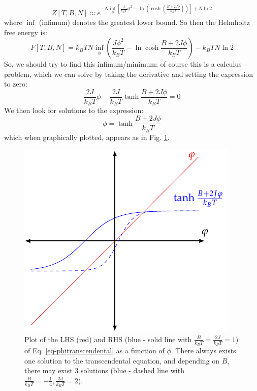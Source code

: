 \begin{equation}
    Z[T, B, N] \approx e^{-N\inf_\phi\left[\frac{J}{k_B T}\phi^2 - \ln(\cosh(\frac{B + 2J\phi}{k_B T}))\right] + N\ln 2}
\end{equation}
where $\inf$ (infimum) denotes the greatest lower bound. So then the Helmholtz free energy is:
\begin{equation}
    F[T, B, N] = k_B T N \inf_\phi \left(\frac{J\phi^2}{k_B T} - \ln\cosh\frac{B + 2J\phi}{k_B T}\right) - k_B T N\ln 2
\end{equation}
So, we should try to find this infimum/minimum; of course this is a calculus problem, which we can solve by taking the derivative and setting the expression to zero:
\begin{equation}
    \frac{2J}{k_B T}\phi - \frac{2J}{k_B T}\tanh \frac{B + 2J\phi}{k_B T} = 0
\end{equation}
We then look for solutions to the expression:
\begin{equation}\label{eq-phitranscendental}
    \phi = \tanh \frac{B + 2J\phi}{k_B T}
\end{equation}
which when graphically plotted, appears as in Fig. \ref{fig-phitranscendental}.

\begin{figure}[htbp]
    \centering
    \includegraphics{Images/fig-phitranscendental.pdf}
    
    \caption{Plot of the LHS (red) and RHS (blue - solid line with $\frac{B}{k_BT} = \frac{2J}{k_BT} = 1$) of Eq. \eqref{eq-phitranscendental} as a function of $\phi$. There always exists one solution to the transcendental equation, and depending on $B$, there may exist 3 solutions (blue - dashed line with $\frac{B}{k_BT} = -\frac{1}{4}, \frac{2J}{k_BT} = 2$).}
    \label{fig-phitranscendental}
\end{figure}

